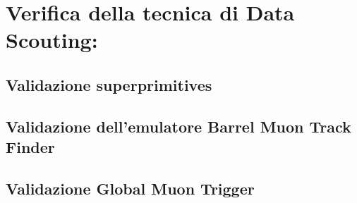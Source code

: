 \chapter{Verifica della tecnica di Data Scouting:}

\section{Validazione superprimitives}




\section{Validazione dell'emulatore Barrel Muon Track Finder}

\section{Validazione Global Muon Trigger}


